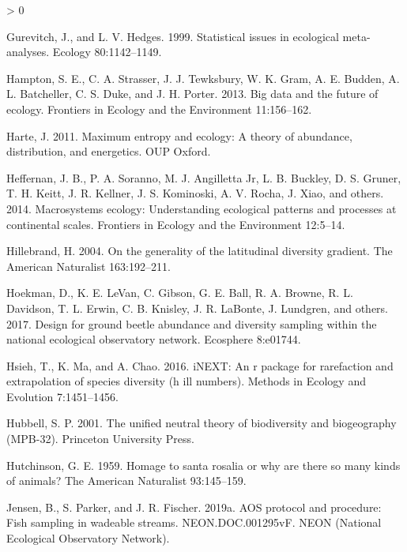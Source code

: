 \documentclass[
  12pt,
]{article}
\newlength{\cslhangindent}
\newenvironment{CSLReferences}[2] %
 {%
  \setlength{\parindent}{0pt}
  \ifodd #1 \everypar{\setlength{\hangindent}{\cslhangindent}}\ignorespaces\fi
  \ifnum #2 > 0
  \setlength{\parskip}{#2\baselineskip}
  \fi
 }%
 {}
\begin{document}
\begin{CSLReferences}{1}{0}
\leavevmode\hypertarget{ref-gurevitch1999statistical}{}%
Gurevitch, J., and L. V. Hedges. 1999. Statistical issues in ecological meta-analyses. Ecology 80:1142--1149.

\leavevmode\hypertarget{ref-hampton2013big}{}%
Hampton, S. E., C. A. Strasser, J. J. Tewksbury, W. K. Gram, A. E. Budden, A. L. Batcheller, C. S. Duke, and J. H. Porter. 2013. Big data and the future of ecology. Frontiers in Ecology and the Environment 11:156--162.

\leavevmode\hypertarget{ref-harte2011maximum}{}%
Harte, J. 2011. Maximum entropy and ecology: A theory of abundance, distribution, and energetics. OUP Oxford.

\leavevmode\hypertarget{ref-heffernan2014macrosystems}{}%
Heffernan, J. B., P. A. Soranno, M. J. Angilletta Jr, L. B. Buckley, D. S. Gruner, T. H. Keitt, J. R. Kellner, J. S. Kominoski, A. V. Rocha, J. Xiao, and others. 2014. Macrosystems ecology: Understanding ecological patterns and processes at continental scales. Frontiers in Ecology and the Environment 12:5--14.

\leavevmode\hypertarget{ref-hillebrand2004generality}{}%
Hillebrand, H. 2004. On the generality of the latitudinal diversity gradient. The American Naturalist 163:192--211.

\leavevmode\hypertarget{ref-hoekman2017design}{}%
Hoekman, D., K. E. LeVan, C. Gibson, G. E. Ball, R. A. Browne, R. L. Davidson, T. L. Erwin, C. B. Knisley, J. R. LaBonte, J. Lundgren, and others. 2017. Design for ground beetle abundance and diversity sampling within the national ecological observatory network. Ecosphere 8:e01744.

\leavevmode\hypertarget{ref-hsieh2016inext}{}%
Hsieh, T., K. Ma, and A. Chao. 2016. iNEXT: An r package for rarefaction and extrapolation of species diversity (h ill numbers). Methods in Ecology and Evolution 7:1451--1456.

\leavevmode\hypertarget{ref-hubbell2001unified}{}%
Hubbell, S. P. 2001. The unified neutral theory of biodiversity and biogeography (MPB-32). Princeton University Press.

\leavevmode\hypertarget{ref-hutchinson1959homage}{}%
Hutchinson, G. E. 1959. Homage to santa rosalia or why are there so many kinds of animals? The American Naturalist 93:145--159.

\leavevmode\hypertarget{ref-Jensen2019a}{}%
Jensen, B., S. Parker, and J. R. Fischer. 2019a. AOS protocol and procedure: Fish sampling in wadeable streams. NEON.DOC.001295vF. NEON (National Ecological Observatory Network).


\end{CSLReferences}
\end{document}
